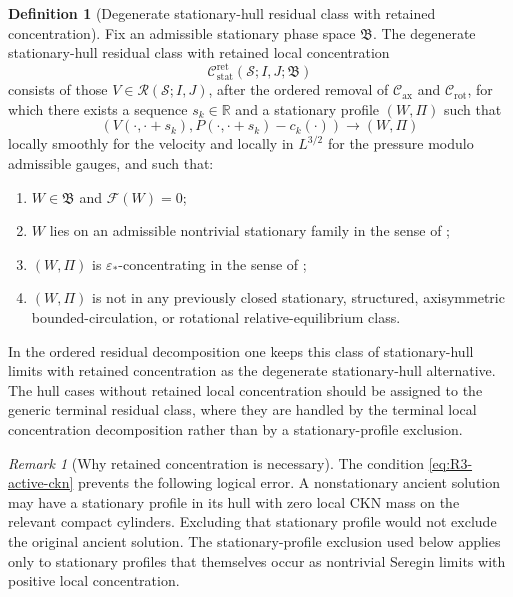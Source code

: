 \documentclass[11pt]{amsart}
\numberwithin{equation}{section}
\theoremstyle{plain}
\theoremstyle{definition}
\newtheorem{definition}[theorem]{Definition}
\theoremstyle{remark}
\newtheorem{remark}[theorem]{Remark}
\newcommand{\Cax}{\mathcal C_{\mathrm{ax}}}
\newcommand{\Crot}{\mathcal C_{\mathrm{rot}}}
\newcommand{\Cstat}{\mathcal C_{\mathrm{stat}}^{\mathrm{ret}}}
\begin{document}
\begin{definition}[Degenerate stationary-hull residual class with retained concentration]
\label{def:R3-active-class}
Fix an admissible stationary phase space \(\mathfrak B\).  The degenerate
stationary-hull residual class with retained local concentration
\[
   \Cstat(\mathcal S;I,J;\mathfrak B)
\]
consists of those \(V\in\mathcal R(\mathcal S;I,J)\), after the ordered
removal of \(\Cax\) and \(\Crot\), for which there exists a
sequence \(s_k\in\mathbb R\) and a stationary profile \((W,\Pi)\) such that
\begin{equation}\label{eq:R3-hull-convergence}
   (V(\cdot,\cdot+s_k),P(\cdot,\cdot+s_k)-c_k(\cdot))
   \longrightarrow (W,\Pi)
\end{equation}
locally smoothly for the velocity and locally in \(L^{3/2}\) for the pressure
modulo admissible gauges, and such that:
\begin{enumerate}[label=(\roman*)]
   \item \(W\in\mathfrak B\) and \(\mathcal F(W)=0\);
   \item \(W\) lies on an admissible nontrivial stationary family in the sense
      of ;
   \item \((W,\Pi)\) is \(\varepsilon_*\)-concentrating in the sense of
      ;
   \item \((W,\Pi)\) is not in any previously closed stationary, structured,
      axisymmetric bounded-circulation, or rotational relative-equilibrium
      class.
\end{enumerate}
In the ordered residual decomposition one keeps this class of stationary-hull
limits with retained concentration as the degenerate stationary-hull
alternative.  The hull cases
without retained local concentration
should be assigned to the generic terminal residual class, where they are
handled by the terminal local concentration decomposition rather than by a
stationary-profile exclusion.
\end{definition}

\begin{remark}[Why retained concentration is necessary]
\label{rem:R3-active-necessary}
The condition \eqref{eq:R3-active-ckn} prevents the following logical error.  A
nonstationary ancient solution may have a stationary profile in its hull with
zero local CKN mass on the relevant compact cylinders.  Excluding that stationary
profile would not exclude the original ancient solution.  The
stationary-profile exclusion used below applies only to stationary profiles
that themselves occur as nontrivial Seregin limits with positive local
concentration.
\end{remark}
\end{document}
